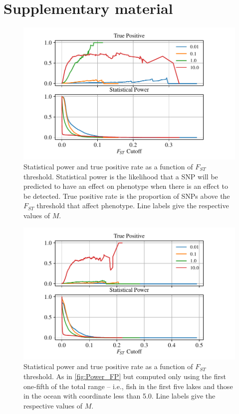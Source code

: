 \documentclass{article}
\begin{document}
\section*{Supplementary material}

\begin{figure}
    \begin{center}
          \includegraphics{Final_Plots/True_Power_0_25_500.pdf}
          \caption{ 
        Statistical power and true positive rate as a function of $F_{ST}$ threshold. 
        Statistical power is the likelihood that a SNP will be predicted to have an effect on phenotype when there is an effect to be detected.
        True positive rate is the proportion of SNPs above the $F_{ST}$ threshold that affect phenotype.
        Line labels give the respective values of $M$.
          \label{fig:Power_FP}
          }
    \end{center}
\end{figure}

\begin{figure}
    \begin{center}
        \includegraphics{Final_Plots/True_Power_0_5_500.pdf}
          \caption{ 
        Statistical power and true positive rate as a function of $F_{ST}$ threshold. As in \autoref{fig:Power_FP}
        but computed only using the first one-fifth of the total range -- i.e., fish in the first five lakes and those in the ocean with coordinate less than 5.0.
        Line labels give the respective values of $M$.
         	}
          \label{fig:Power_FP_5lakes}
    \end{center}
\end{figure}
\end{document}
